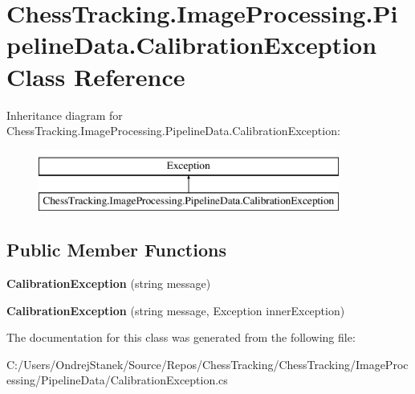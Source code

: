 \hypertarget{class_chess_tracking_1_1_image_processing_1_1_pipeline_data_1_1_calibration_exception}{}\section{Chess\+Tracking.\+Image\+Processing.\+Pipeline\+Data.\+Calibration\+Exception Class Reference}
\label{class_chess_tracking_1_1_image_processing_1_1_pipeline_data_1_1_calibration_exception}
Inheritance diagram for Chess\+Tracking.\+Image\+Processing.\+Pipeline\+Data.\+Calibration\+Exception\+:\begin{figure}[H]
\begin{center}
\leavevmode
\includegraphics[height=2.000000cm]{class_chess_tracking_1_1_image_processing_1_1_pipeline_data_1_1_calibration_exception}
\end{center}
\end{figure}
\subsection*{Public Member Functions}
\begin{DoxyCompactItemize}
\item 
\mbox{\label{class_chess_tracking_1_1_image_processing_1_1_pipeline_data_1_1_calibration_exception_ab03e4c249bb5c0018cd464ba592b7044}} 
{\bfseries Calibration\+Exception} (string message)
\item 
\mbox{\label{class_chess_tracking_1_1_image_processing_1_1_pipeline_data_1_1_calibration_exception_a5b2c926f8f8ae1b8907af6f70d21b358}} 
{\bfseries Calibration\+Exception} (string message, Exception inner\+Exception)
\end{DoxyCompactItemize}


The documentation for this class was generated from the following file\+:\begin{DoxyCompactItemize}
\item 
C\+:/\+Users/\+Ondrej\+Stanek/\+Source/\+Repos/\+Chess\+Tracking/\+Chess\+Tracking/\+Image\+Processing/\+Pipeline\+Data/Calibration\+Exception.\+cs\end{DoxyCompactItemize}
